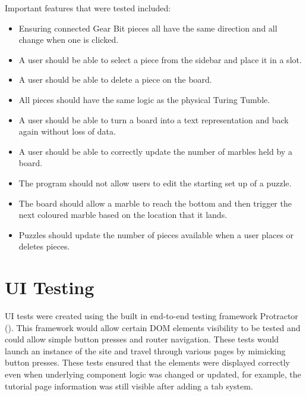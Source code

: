 \documentclass{l4proj}
\begin{document}
Important features that were tested included:
\begin{itemize}
    \item Ensuring connected Gear Bit pieces all have the same direction and all change when one is clicked.
    \item A user should be able to select a piece from the sidebar and place it in a slot.
    \item A user should be able to delete a piece on the board.
    \item All pieces should have the same logic as the physical Turing Tumble.
    \item A user should be able to turn a board into a text representation and back again without loss of data.
    \item A user should be able to correctly update the number of marbles held by a board.
    \item The program should not allow users to edit the starting set up of a puzzle.
    \item The board should allow a marble to reach the bottom and then trigger the next coloured marble based on the location that it lands.
    \item Puzzles should update the number of pieces available when a user places or deletes pieces.
\end{itemize}

\section{UI Testing}
UI tests were created using the built in end-to-end testing framework Protractor (\cite{protractor}). This framework would allow certain DOM elements visibility to be tested and could allow simple button presses and router navigation. These tests would launch an instance of the site and travel through various pages by mimicking button presses. These tests ensured that the elements were displayed correctly even when underlying component logic was changed or updated, for example, the tutorial page information was still visible after adding a tab system. 
\end{document}

